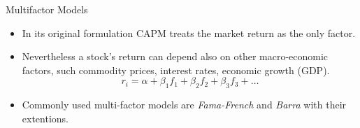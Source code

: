 \documentclass{beamer}
\begin{document}
\begin{frame}{Multifactor Models}
  \begin{itemize}
  \item In its original formulation CAPM treats the market return as the only factor.
  \item Nevertheless a stock’s return can depend also on other macro-economic factors, such commodity prices, interest rates, economic growth (GDP).
    \begin{equation*}
      r_i = \alpha + \beta_1 f_1 + \beta_2 f_2 + \beta_3 f_3 + \ldots
    \end{equation*}
  \item Commonly used multi-factor models are \emph{Fama-French} and \emph{Barra} with their extentions.
  \end{itemize}
\end{frame}
\end{document}

